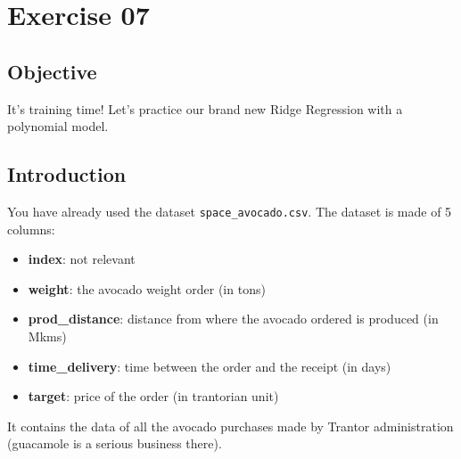 \chapter{Exercise 07}
%
{}
\makeheaderfilesforbidden


\section*{Objective}
It's training time!  
Let's practice our brand new Ridge Regression with a polynomial model.

\section*{Introduction}
You have already used the dataset \texttt{space\_avocado.csv}.
The dataset is made of 5 columns:
\begin{itemize}
  \item \textbf{index}: not relevant
  \item \textbf{weight}: the avocado weight order (in tons)
  \item \textbf{prod\_distance}: distance from where the avocado ordered is produced (in Mkms)
  \item \textbf{time\_delivery}: time between the order and the receipt (in days)
  \item \textbf{target}: price of the order (in trantorian unit)
\end{itemize}
It contains the data of all the avocado purchases made by Trantor administration 
(guacamole is a serious business there).\\

